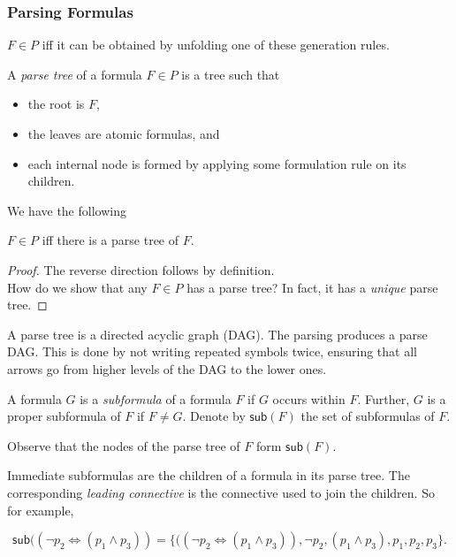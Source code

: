 \subsubsection{Parsing Formulas}

$F\in P$ iff it can be obtained by unfolding one of these generation rules.

\begin{definition}
A \textit{parse tree} of a formula $F\in P$ is a tree such that
\begin{itemize}
    \item the root is $F$,
    \item the leaves are atomic formulas, and
    \item each internal node is formed by applying some formulation rule on its children.
\end{itemize}
\end{definition}

We have the following 

\begin{theorem}
$F\in P$ iff there is a parse tree of $F$.
\end{theorem}
\begin{proof}
The reverse direction follows by definition.\\
How do we show that any $F\in P$ has a parse tree? In fact, it has a \textit{unique} parse tree.
\end{proof}

A parse tree is a directed acyclic graph (DAG). The parsing produces a parse DAG. This is done by not writing repeated symbols twice, ensuring that all arrows go from higher levels of the DAG to the lower ones.

\begin{definition}
A formula $G$ is a \textit{subformula} of a formula $F$ if $G$ occurs within $F$. Further, $G$ is a proper subformula of $F$ if $F\neq G$. Denote by $\mathsf{sub}(F)$ the set of subformulas of $F$.
\end{definition}

Observe that the nodes of the parse tree of $F$ form $\mathsf{sub}(F)$.

Immediate subformulas are the children of a formula in its parse tree. The corresponding \textit{leading connective} is the connective used to join the children. So for example,

\[ \mathsf{sub}((\neg p_2 \iff (p_1 \wedge p_3)) = \{((\neg p_2 \iff (p_1 \wedge p_3)), \neg p_2, (p_1 \wedge p_3), p_1, p_2, p_3\}. \]

